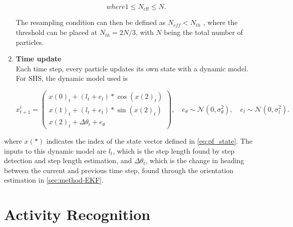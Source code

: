 \begin{enumerate}
\begin{subequations}
		where
		
		\begin{equation}
		1 \leq N_{\mathrm{cff}} \leq N.
		\end{equation}
	\end{subequations}
	
	The resampling condition can then be defined as $N_{eff} < N_{th}$ \cite{gustafsson2010statistical}, where the threshold can be placed at $N_{th} = 2N/3$, with $N$ being the total number of particles.
	
	
	\item \textbf{Time update} \\	
	Each time step, every particle updates its own state with a dynamic model. For SHS, the dynamic model used is
	
	\begin{equation}
	\label{eq:SHS_dynamic_model_with_noise}
	x^i_{t + 1}
	=
	\left(\begin{array}{l}
	x(0)_{t} + (l_{t} + e_l) * \cos (x(2)_{t}) \\
	x(1)_{t} + (l_{t} + e_l) * \sin (x(2)_{t}) \\
	x(2)_{t} + \Delta \theta_t + e_\theta 
	\end{array}\right), \quad
	e_{\theta} \sim \mathcal{N}\left(0, \sigma_{\theta}^{2}\right), \quad e_{l} \sim \mathcal{N}\left(0, \sigma_{l}^{2}\right).
	\end{equation}
\end{enumerate}

where $x(*)$ indicates the index of the state vector defined in \eqref{eq:pf_state}. The inputs to this dynamic model are $l_{t}$, which is the step length found by step detection and step length estimation, and $\Delta \theta_t$, which is the change in heading between the current and previous time step, found through the orientation estimation in \cref{sec:method-EKF}.

\section{Activity Recognition}
\label{sec:method-AR}


